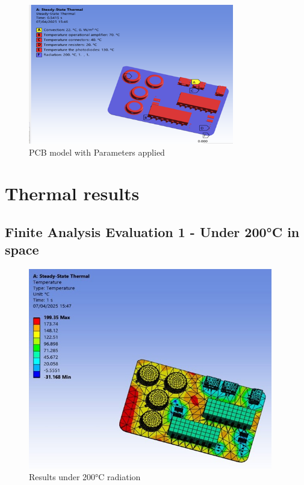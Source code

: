 \begin{figure}[htbp]
    \centering
    \includegraphics[width=0.8\textwidth]{chapters/methodology/ThermalAnalysis/Fig1parameters.png}
    \caption{PCB model with Parameters applied}
    \label{fig:PCBparameters}
\end{figure}

\section{Thermal results}

\subsection{Finite Analysis Evaluation 1 - Under 200°C in space}

\begin{figure}[htbp]
    \centering
    \includegraphics[width=0.95\textwidth]{chapters/methodology/ThermalAnalysis/Fig2under200C.jpg}
    \caption{Results under 200°C radiation}
    \label{fig:results_200C}
\end{figure}

